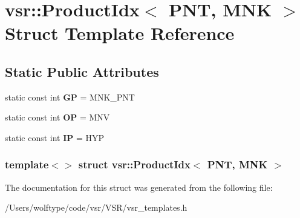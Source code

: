 \hypertarget{structvsr_1_1_product_idx_3_01_p_n_t_00_01_m_n_k_01_4}{\section{vsr\-:\-:Product\-Idx$<$ P\-N\-T, M\-N\-K $>$ Struct Template Reference}
\label{structvsr_1_1_product_idx_3_01_p_n_t_00_01_m_n_k_01_4}
}
\subsection*{Static Public Attributes}
\begin{DoxyCompactItemize}
\item 
\hypertarget{structvsr_1_1_product_idx_3_01_p_n_t_00_01_m_n_k_01_4_ac7abbcb44f60b917bbcdcfff2ce3fd33}{static const int {\bfseries G\-P} = M\-N\-K\-\_\-\-P\-N\-T}\label{structvsr_1_1_product_idx_3_01_p_n_t_00_01_m_n_k_01_4_ac7abbcb44f60b917bbcdcfff2ce3fd33}

\item 
\hypertarget{structvsr_1_1_product_idx_3_01_p_n_t_00_01_m_n_k_01_4_a983061b3930e2723f6c9c65ac37b9f1f}{static const int {\bfseries O\-P} = M\-N\-V}\label{structvsr_1_1_product_idx_3_01_p_n_t_00_01_m_n_k_01_4_a983061b3930e2723f6c9c65ac37b9f1f}

\item 
\hypertarget{structvsr_1_1_product_idx_3_01_p_n_t_00_01_m_n_k_01_4_a156f12082c7381e06a3ef42c780d2741}{static const int {\bfseries I\-P} = H\-Y\-P}\label{structvsr_1_1_product_idx_3_01_p_n_t_00_01_m_n_k_01_4_a156f12082c7381e06a3ef42c780d2741}

\end{DoxyCompactItemize}
\subsubsection*{template$<$$>$ struct vsr\-::\-Product\-Idx$<$ P\-N\-T, M\-N\-K $>$}



The documentation for this struct was generated from the following file\-:\begin{DoxyCompactItemize}
\item 
/\-Users/wolftype/code/vsr/\-V\-S\-R/vsr\-\_\-templates.\-h\end{DoxyCompactItemize}
